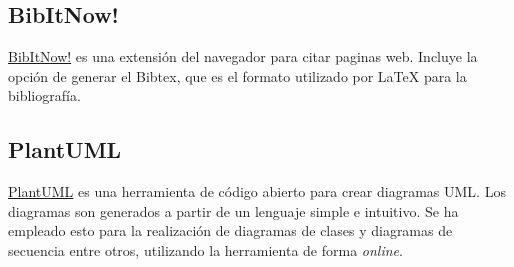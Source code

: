 \subsection{BibItNow!}
\href{https://addons.mozilla.org/es/firefox/addon/bibitnow/}{BibItNow!} es una extensión del navegador para citar paginas web. Incluye la opción de generar el Bibtex, que es el formato utilizado por \LaTeX{} para la bibliografía.

\subsection{PlantUML}
\href{https://plantuml.com/es/}{PlantUML} es una herramienta de código abierto para crear diagramas UML. Los diagramas son generados a partir de un lenguaje simple e intuitivo. Se ha empleado esto para la realización de diagramas de clases y diagramas de secuencia entre otros, utilizando la herramienta de forma \emph{online}.